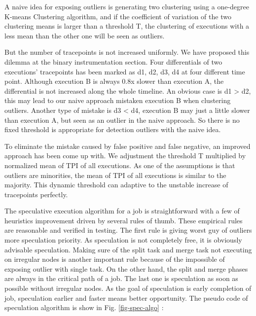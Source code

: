 A naive idea for exposing outliers is generating two clustering using a one-degree K-means Clustering algorithm, and if the coefficient of variation of the two clustering means is larger than a threshold T, the clustering of executions with a less mean than the other one  will be seen as outliers.

But the number of tracepoints is not increased uniformly. We have proposed this dilemma at the binary instrumentation section. Four differentials of two executions’ tracepoints has been marked as d1, d2, d3, d4 at four different time point. Although execution B is always 0.8x slower than execution A, the differential is not increased along the whole timeline. An obvious case is d1 > d2, this may lead to our naive approach mistaken execution B when clustering outliers. Another type of mistake is d3 < d4, execution B may just a little slower than execution A, but seen as an outlier in the naive approach. So there is no fixed threshold is appropriate for detection outliers with the naive idea.

To eliminate  the mistake caused by false positive and false negative, an improved approach has been come up with. We adjustment the threshold T multiplied by normalized mean of TPI of all executions. As one of the assumptions is that outliers are minorities, the mean of TPI of all executions is similar to the majority. This dynamic threshold can adaptive to the unstable increase of tracepoints perfectly.

The speculative execution algorithm for a job is straightforward with a few of heuristics improvement driven by several rules of thumb. These empirical rules are reasonable and verified in testing. The first rule is giving worst guy of outliers more speculation priority. As speculation is not completely free, it is obviously advisable speculation. Making sure of the split task and merge task not executing on irregular nodes is another important rule because of the impossible of exposing outlier with single task. On the other hand, the split and merge phases are always in the critical path of a job. The last one is speculation as soon as possible without irregular nodes. As the goal of speculation is early completion of job, speculation earlier and faster means better opportunity. The pseudo code of speculation algorithm is show in Fig. \ref{fig-spec-algo} :

